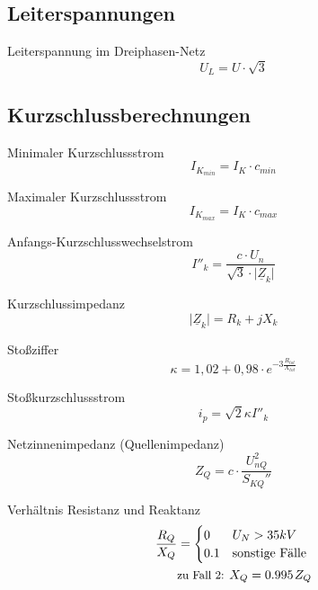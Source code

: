 \documentclass[11pt, a4paper, draft, fleqn, twocolumn]{article}
\numberwithin{equation}{subsection}
\begin{document}
\subsection{Leiterspannungen}

Leiterspannung im Dreiphasen-Netz
\begin{equation}
    U_L = U \cdot \sqrt{3}
\end{equation}

\subsection{Kurzschlussberechnungen}

Minimaler Kurzschlussstrom
\begin{equation}
    I_{K_{min}} = I_K \cdot c_{min}
\end{equation}

\noindent Maximaler Kurzschlussstrom
\begin{equation}
    I_{K_{max}} = I_K \cdot c_{max}
\end{equation}

\noindent Anfangs-Kurzschlusswechselstrom
\begin{equation}
    I''_k = \dfrac{c \cdot U_n}{\sqrt{3}\cdot \lvert \underline{Z}_k \rvert}
\end{equation}

\noindent Kurzschlussimpedanz
\begin{equation}
    \lvert \underline{Z}_k \rvert = R_k + j X_k
\end{equation}

\noindent Stoßziffer
\begin{equation}
    \kappa = 1,02 + 0,98 \cdot e^{-3 \frac{R_{tot}}{X_{tot}}}
\end{equation}

\noindent Stoßkurzschlussstrom
\begin{equation}
    i_p = \sqrt{2} \kappa I''_k
\end{equation}

\noindent Netzinnenimpedanz (Quellenimpedanz)
\begin{equation}
    Z_{Q} = c \cdot \frac{U_{nQ}^2}{S_{KQ}''}
\end{equation}

\noindent Verhältnis Resistanz und Reaktanz
\begin{equation}
\begin{split}
\frac{R_Q}{X_Q} & =
\begin{cases}
0 & U_N > 35 kV \\
0.1 & \text{sonstige Fälle}
\end{cases} \\
& \text{\small zu Fall 2: } X_Q = 0.995 \hspace{0.1em} Z_Q
\end{split}
\end{equation}
\end{document}
